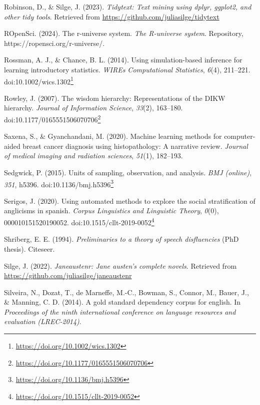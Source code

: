 \documentclass[
  letterpaper,
]{latex/krantz}
\newlength{\cslhangindent}
\newenvironment{CSLReferences}[2] %
 {\begin{list}{}{%
  \setlength{\itemindent}{0pt}
  \setlength{\leftmargin}{0pt}
  \setlength{\parsep}{0pt}
  \ifodd #1
   \setlength{\leftmargin}{\cslhangindent}
   \setlength{\itemindent}{-1\cslhangindent}
  \fi
  \setlength{\itemsep}{#2\baselineskip}}}
 {\end{list}}
\theoremstyle{definition}
\theoremstyle{remark}
\DeclareRobustCommand{\href}[2]{#2\footnote{\url{#1}}}
\begin{document}
\begin{CSLReferences}{1}{0}
Robinson, D., \& Silge, J. (2023). \emph{Tidytext: Text mining using
dplyr, ggplot2, and other tidy tools}. Retrieved from
\url{https://github.com/juliasilge/tidytext}

ROpenSci. (2024). The r-universe system. \emph{The R-universe system}.
Repository, https://ropensci.org/r-universe/.

Rossman, A. J., \& Chance, B. L. (2014). Using simulation-based
inference for learning introductory statistics. \emph{WIREs
Computational Statistics}, \emph{6}(4), 211--221.
doi:\href{https://doi.org/10.1002/wics.1302}{10.1002/wics.1302}

Rowley, J. (2007). The wisdom hierarchy: Representations of the DIKW
hierarchy. \emph{Journal of Information Science}, \emph{33}(2),
163--180.
doi:\href{https://doi.org/10.1177/0165551506070706}{10.1177/0165551506070706}

Saxena, S., \& Gyanchandani, M. (2020). Machine learning methods for
computer-aided breast cancer diagnosis using histopathology: A narrative
review. \emph{Journal of medical imaging and radiation sciences},
\emph{51}(1), 182--193.

Sedgwick, P. (2015). Units of sampling, observation, and analysis.
\emph{BMJ (online)}, \emph{351}, h5396.
doi:\href{https://doi.org/10.1136/bmj.h5396}{10.1136/bmj.h5396}

Serigos, J. (2020). Using automated methods to explore the social
stratification of anglicisms in spanish. \emph{Corpus Linguistics and
Linguistic Theory}, \emph{0}(0), 000010151520190052.
doi:\href{https://doi.org/10.1515/cllt-2019-0052}{10.1515/cllt-2019-0052}

Shriberg, E. E. (1994). \emph{Preliminaries to a theory of speech
disfluencies} (PhD thesis). Citeseer.

Silge, J. (2022). \emph{Janeaustenr: Jane austen's complete novels}.
Retrieved from \url{https://github.com/juliasilge/janeaustenr}

Silveira, N., Dozat, T., de Marneffe, M.-C., Bowman, S., Connor, M.,
Bauer, J., \& Manning, C. D. (2014). A gold standard dependency corpus
for english. In \emph{Proceedings of the ninth international conference
on language resources and evaluation (LREC-2014)}.


\end{CSLReferences}
\end{document}
